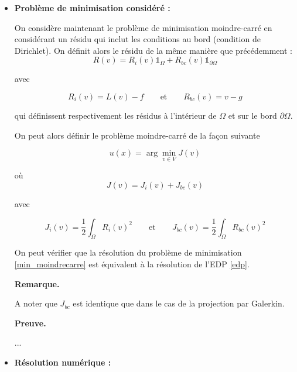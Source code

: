\documentclass[french]{article}
\newenvironment{preuve}[1][]{\begin{tcolorbox}[
	colback=white, %
	colframe=green!70!black, %
	arc=2mm, %
	boxrule=1pt, %
	breakable, enhanced jigsaw
	]
	\textcolor{green!70!black}{\textbf{Preuve.} \\}

	#1
}{\end{tcolorbox}}
\newenvironment{remarque}[1][]{\begin{tcolorbox}[
	colback=white, %
	arc=2mm, %
	borderline={0.5mm}{0mm}{black!15!white},
	borderline={0.5mm}{0mm}{black!50!white,dashed},
	breakable, enhanced jigsaw
	]
	\textcolor{black!70!black}{\textbf{Remarque.}} #1
}{\end{tcolorbox}}
\begin{document}
	\begin{itemize}[label=]
		\item \textbf{Problème de minimisation considéré :}
		
		On considère maintenant le problème de minimisation moindre-carré en considérant un résidu qui inclut les conditions au bord (condition de Dirichlet). On définit alors le résidu de la même manière que précédemment :
		\begin{equation*}
			R(v) = R_i(v)\mathbb{1}_{\Omega} + R_{bc}(v)\mathbb{1}_{\partial \Omega}
		\end{equation*}
		
		avec 
		
		\begin{equation*}
			R_i(v)=L(v) - f \qquad \text{et} \qquad R_{bc}(v)=v-g
		\end{equation*}
		
		qui définissent respectivement les résidus à l'intérieur de $\Omega$ et sur le bord $\partial\Omega$. 
		
		On peut alors définir le problème moindre-carré de la façon suivante
		
		\begin{equation}
			u(x)=\arg\min_{v \in V}J(v) \label{min_moindrecarre}
		\end{equation}
		
		où
		\begin{equation*}
			J(v)=J_i(v)+J_{bc}(v) 
		\end{equation*}
		
		avec 
		
		\begin{equation*}
			J_i(v)=\frac{1}{2}\int_\Omega R_i(v)^2  \qquad \text{et} \qquad J_{bc}(v)=\frac{1}{2}\int_\Omega R_{bc}(v)^2
		\end{equation*}
		
		On peut vérifier que la résolution du problème de minimisation \eqref{min_moindrecarre} est équivalent à la résolution de l'EDP \eqref{edp}.
		
		\begin{remarque}
			A noter que $J_{bc}$ est identique que dans le cas de la projection par Galerkin.
		\end{remarque}
		
		\begin{preuve}
...
		\end{preuve}

		\item \textbf{Résolution numérique :}
		

\end{itemize}
\end{document}
